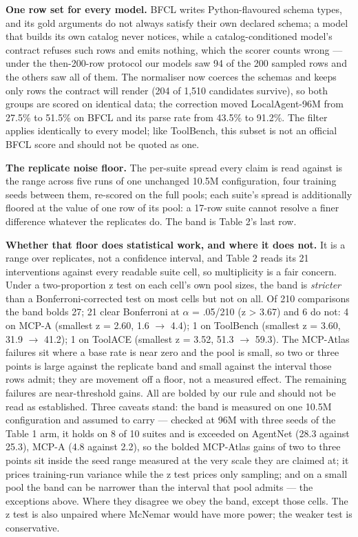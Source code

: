 \documentclass{article}
\begin{document}
\textbf{One row set for every model.} BFCL writes Python-flavoured schema types, and its gold arguments do not always satisfy their own declared schema; a model that builds its own catalog never notices, while a catalog-conditioned model's contract refuses such rows and emits nothing, which the scorer counts wrong --- under the then-200-row protocol our models saw 94 of the 200 sampled rows and the others saw all of them. The normaliser now coerces the schemas and keeps only rows the contract will render (204 of 1,510 candidates survive), so both groups are scored on identical data; the correction moved LocalAgent-96M from 27.5\% to 51.5\% on BFCL and its parse rate from 43.5\% to 91.2\%. The filter applies identically to every model; like ToolBench, this subset is not an official BFCL score and should not be quoted as one.


\textbf{The replicate noise floor.} The per-suite spread every claim is read against is the
range across five runs of one unchanged 10.5M configuration, four training seeds between
them, re-scored on the full pools; each suite's spread is additionally floored at the value
of one row of its pool: a 17-row suite cannot resolve a finer difference whatever the
replicates do. The band is Table 2's last row.


\textbf{Whether that floor does statistical work, and where it does not.} It is a range over
replicates, not a confidence interval, and Table 2 reads its 21 interventions
against every readable suite cell, so multiplicity is a fair concern. Under a two-proportion z
test on each cell's own pool sizes, the band is \emph{stricter} than a
Bonferroni-corrected test on most cells but not on all. Of 210 comparisons the band bolds 27; 21 clear Bonferroni at $\alpha$ = .05/210 (z > 3.67) and 6 do not: 4 on MCP-A (smallest z = 2.60, 1.6 $\rightarrow$ 4.4); 1 on ToolBench (smallest z = 3.60, 31.9 $\rightarrow$ 41.2); 1 on ToolACE (smallest z = 3.52, 51.3 $\rightarrow$ 59.3). The MCP-Atlas failures sit where a base rate is near zero and the pool is small, so two or three points is large against the replicate band and small against the interval those rows admit; they are movement off a floor, not a measured effect. The remaining failures are near-threshold gains. All are bolded by our rule and should not be read as established. Three caveats stand:
the band is measured on one 10.5M configuration and assumed to carry --- checked at 96M with three seeds of the Table 1 arm, it holds on 8 of 10 suites and is exceeded on AgentNet (28.3 against 25.3), MCP-A (4.8 against 2.2), so the bolded MCP-Atlas gains of two to three points sit inside the seed range measured at the very scale they are claimed at; it
prices training-run variance while the z test prices only sampling; and on a small pool the
band can be narrower than the interval that pool admits --- the exceptions above.
Where they disagree we obey the band, except those cells. The z test
is also unpaired where McNemar would have more power; the weaker test is
conservative.
\end{document}
